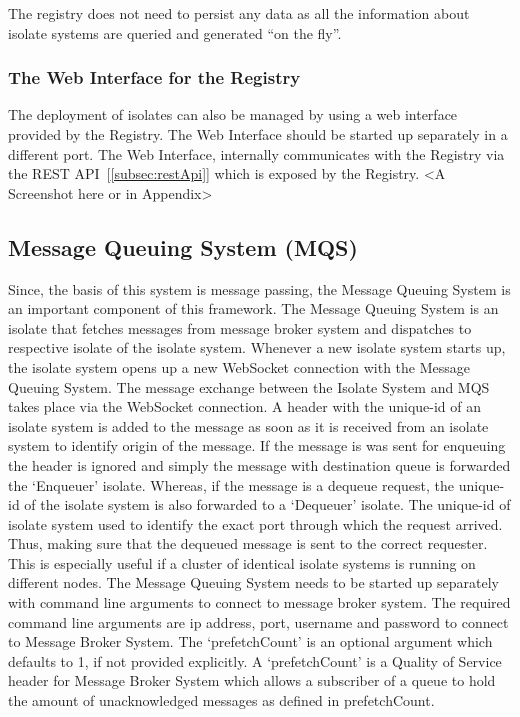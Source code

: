 The registry does not need to persist any data as all the information about isolate systems are queried and generated “on the fly”.

  \subsubsection{The Web Interface for the Registry}
  The deployment of isolates can also be managed by using a web interface provided by the Registry. The Web Interface should be started up separately in a different port. The Web Interface, internally communicates with the Registry via the REST API~[\ref{subsec:restApi}] which is exposed by the Registry.
  <A Screenshot here or in Appendix>

\subsection{Message Queuing System (MQS)}
  Since, the basis of this system is message passing, the Message Queuing System is an important component of this framework. The Message Queuing System is an isolate that fetches messages from message broker system and dispatches to respective isolate of the isolate system. Whenever a new isolate system starts up, the isolate system opens up a new WebSocket connection with the Message Queuing System. The message exchange between the Isolate System and MQS takes place via the WebSocket connection. A header with the unique-id of an isolate system is added to the message as soon as it is received from an isolate system to identify origin of the message. If the message is was sent for enqueuing the header is ignored and simply the message with destination queue is forwarded the ‘Enqueuer’ isolate. Whereas, if the message is a dequeue request, the unique-id of the isolate system is also forwarded to a ‘Dequeuer’ isolate. The unique-id of isolate system used to identify the exact port through which the request arrived. Thus, making sure that the dequeued message is sent to the correct requester. This is especially useful if a cluster of identical isolate systems is running on different nodes.
  The Message Queuing System needs to be started up separately with command line arguments to connect to message broker system. The required command line arguments are ip address, port, username and password to connect to Message Broker System. The ‘prefetchCount’ is an optional argument which defaults to 1, if not provided explicitly. A ‘prefetchCount’ is a Quality of Service header for Message Broker System which allows a subscriber of a queue to hold the amount of unacknowledged messages as defined in prefetchCount.

